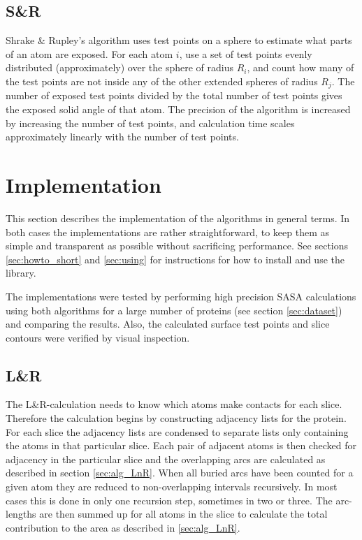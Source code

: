 \documentclass[a4paper,11pt]{article}
\begin{document}
\subsection{S\&R}

Shrake \& Rupley's algorithm uses test points on a sphere to estimate
what parts of an atom are exposed. For each atom $i$, use a set of
test points evenly distributed (approximately) over the sphere of
radius $R_i$, and count how many of the test points are not inside any
of the other extended spheres of radius $R_j$. The number of exposed
test points divided by the total number of test points gives the
exposed solid angle of that atom. The precision of the algorithm is
increased by increasing the number of test points, and calculation
time scales approximately linearly with the number of test points.


\section{Implementation}\label{sec:imp}

This section describes the implementation of the algorithms in general
terms. In both cases the implementations are rather straightforward,
to keep them as simple and transparent as possible without sacrificing
performance. See sections \ref{sec:howto_short} and \ref{sec:using}
for instructions for how to install and use the library.

The implementations were tested by performing high precision SASA
calculations using both algorithms for a large number of proteins (see
section \ref{sec:dataset}) and comparing the results. Also, the
calculated surface test points and slice contours were verified by
visual inspection.


\subsection{L\&R}

The L\&R-calculation needs to know which atoms make contacts for each
slice. Therefore the calculation begins by constructing adjacency
lists for the protein. For each slice the adjacency lists are
condensed to separate lists only containing the atoms in that
particular slice. Each pair of adjacent atoms is then checked for
adjacency in the particular slice and the overlapping arcs are
calculated as described in section \ref{sec:alg_LnR}. When all buried
arcs have been counted for a given atom they are reduced to
non-overlapping intervals recursively. In most cases this is done in
only one recursion step, sometimes in two or three. The arc-lengths
are then summed up for all atoms in the slice to calculate the total
contribution to the area as described in \ref{sec:alg_LnR}.
\end{document}
